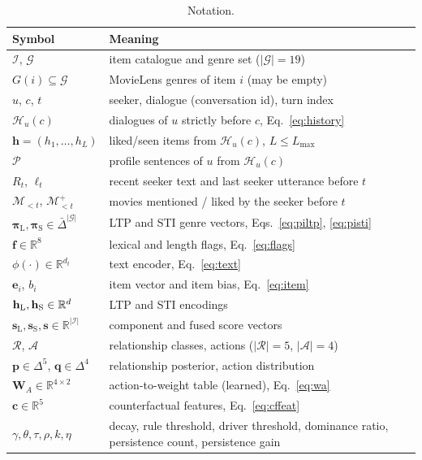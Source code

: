 \begin{table}[t]
  \centering
  \caption{Notation.}
  \label{tab:notation}
  \footnotesize
  \begin{tabular}{@{}lp{}@{}}
    \toprule
    Symbol & Meaning \\
    \midrule
    $\mathcal{I}$, $\mathcal{G}$ & item catalogue and genre set ($|\mathcal{G}|=19$) \\
    $G(i)\subseteq\mathcal{G}$ & MovieLens genres of item $i$ (may be empty) \\
    $u$, $c$, $t$ & seeker, dialogue (conversation id), turn index \\
    $\mathcal{H}_u(c)$ & dialogues of $u$ strictly before $c$, Eq.~\eqref{eq:history} \\
    $\mathbf{h}=(h_1,\dots,h_L)$ & liked/seen items from $\mathcal{H}_u(c)$, $L\le L_{\max}$ \\
    $\mathcal{P}$ & profile sentences of $u$ from $\mathcal{H}_u(c)$ \\
    $R_t$, $\ell_t$ & recent seeker text and last seeker utterance before $t$ \\
    $\mathcal{M}_{<t}$, $\mathcal{M}^{+}_{<t}$ & movies mentioned / liked by the seeker before $t$ \\
    $\boldsymbol{\pi}_{\mathrm{L}},\boldsymbol{\pi}_{\mathrm{S}}\in\bar{\Delta}^{|\mathcal{G}|}$ & LTP and STI genre vectors, Eqs.~\eqref{eq:piltp}, \eqref{eq:pisti} \\
    $\mathbf{f}\in\mathbb{R}^{8}$ & lexical and length flags, Eq.~\eqref{eq:flags} \\
    $\phi(\cdot)\in\mathbb{R}^{d_t}$ & text encoder, Eq.~\eqref{eq:text} \\
    $\mathbf{e}_i$, $b_i$ & item vector and item bias, Eq.~\eqref{eq:item} \\
    $\mathbf{h}_{\mathrm{L}},\mathbf{h}_{\mathrm{S}}\in\mathbb{R}^{d}$ & LTP and STI encodings \\
    $\mathbf{s}_{\mathrm{L}},\mathbf{s}_{\mathrm{S}},\mathbf{s}\in\mathbb{R}^{|\mathcal{I}|}$ & component and fused score vectors \\
    $\mathcal{R}$, $\mathcal{A}$ & relationship classes, actions ($|\mathcal{R}|=5$, $|\mathcal{A}|=4$) \\
    $\mathbf{p}\in\Delta^{5}$, $\mathbf{q}\in\Delta^{4}$ & relationship posterior, action distribution \\
    $\mathbf{W}_{\!A}\in\mathbb{R}^{4\times 2}$ & action-to-weight table (learned), Eq.~\eqref{eq:wa} \\
    $\mathbf{c}\in\mathbb{R}^{5}$ & counterfactual features, Eq.~\eqref{eq:cffeat} \\
    $\gamma,\theta,\tau,\rho,k,\eta$ & decay, rule threshold, driver threshold, dominance ratio, persistence count, persistence gain \\
    \bottomrule
  \end{tabular}
\end{table}

